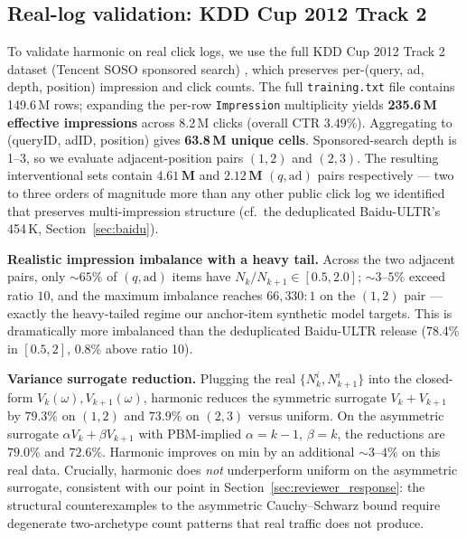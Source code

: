 \documentclass[sigconf]{acmart}
\begin{document}
\subsection{Real-log validation: KDD Cup 2012 Track 2}
\label{sec:kdd2012}

To validate harmonic on real click logs, we use the full KDD Cup 2012 Track 2
dataset (Tencent SOSO sponsored search) \cite{kddcup2012track2}, which preserves
per-(query, ad, depth, position) impression and click counts. The full
\texttt{training.txt} file contains 149.6\,M rows; expanding the per-row
\texttt{Impression} multiplicity yields \textbf{235.6\,M effective impressions}
across 8.2\,M clicks (overall CTR $3.49\%$). Aggregating to (queryID, adID, position)
gives \textbf{63.8\,M unique cells}. Sponsored-search depth is 1--3, so we evaluate
adjacent-position pairs $(1,2)$ and $(2,3)$. The resulting interventional sets
contain $\mathbf{4.61\,M}$ and $\mathbf{2.12\,M}$ $(q,\mathrm{ad})$ pairs respectively
--- two to three orders of magnitude more than any other public click log we
identified that preserves multi-impression structure (cf.\ the deduplicated
Baidu-ULTR's 454\,K, Section~\ref{sec:baidu}).

\textbf{Realistic impression imbalance with a heavy tail.} Across the two adjacent
pairs, only $\sim 65\%$ of $(q,\mathrm{ad})$ items have $N_k/N_{k+1}\in [0.5, 2.0]$;
$\sim 3$--$5\%$ exceed ratio $10$, and the maximum imbalance reaches $66{,}330\!:\!1$
on the $(1,2)$ pair --- exactly the heavy-tailed regime our anchor-item synthetic
model targets. This is dramatically more imbalanced than the deduplicated Baidu-ULTR
release (78.4\% in $[0.5, 2]$, 0.8\% above ratio 10).

\textbf{Variance surrogate reduction.}
Plugging the real $\{N_k^i, N_{k+1}^i\}$ into the closed-form $V_k(\omega), V_{k+1}(\omega)$,
harmonic reduces the symmetric surrogate $V_k+V_{k+1}$ by $\mathbf{79.3\%}$ on
$(1,2)$ and $\mathbf{73.9\%}$ on $(2,3)$ versus uniform. On the asymmetric
surrogate $\alpha V_k + \beta V_{k+1}$ with PBM-implied $\alpha = k-1$, $\beta = k$,
the reductions are $\mathbf{79.0\%}$ and $\mathbf{72.6\%}$. Harmonic improves on
min by an additional $\sim 3$--$4\%$ on this real data. Crucially, harmonic does
\emph{not} underperform uniform on the asymmetric surrogate, consistent with our
point in Section~\ref{sec:reviewer_response}: the structural counterexamples to
the asymmetric Cauchy--Schwarz bound require degenerate two-archetype count
patterns that real traffic does not produce.
\end{document}
